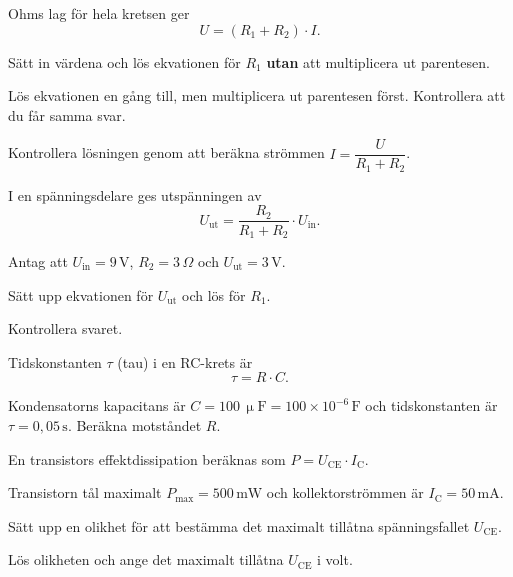 Ohms lag för hela kretsen ger
\[
  U = (R_1 + R_2) \cdot I.
\]
\begin{parts}
  \item Sätt in värdena och lös ekvationen för $R_1$ \textbf{utan} att multiplicera ut parentesen.
  \item Lös ekvationen en gång till, men multiplicera ut parentesen först. Kontrollera att du får
    samma svar.
  \item Kontrollera lösningen genom att beräkna strömmen $I = \dfrac{U}{R_1 + R_2}$.
\end{parts}

I en spänningsdelare ges utspänningen av
\[
  U_{\text{ut}} = \frac{R_2}{R_1 + R_2} \cdot U_{\text{in}}.
\]


Antag att $U_{\text{in}} = 9\,\text{V}$, $R_2 = 3\,\Omega$ och $U_{\text{ut}} = 3\,\text{V}$.
\begin{parts}
  \item Sätt upp ekvationen för $U_{\text{ut}}$ och lös för $R_1$.
  \item Kontrollera svaret.
\end{parts}

Tidskonstanten $\tau$ (tau) i en RC-krets är
\[
  \tau = R \cdot C.
\]


Kondensatorns kapacitans är $C = 100\,\upmu\text{F} = 100 \times 10^{-6}\,\text{F}$ och
tidskonstanten är $\tau = 0{,}05\,\text{s}$. Beräkna motståndet $R$.

En transistors effektdissipation beräknas som $P = U_{\text{CE}} \cdot I_{\text{C}}$.


Transistorn tål maximalt $P_{\max} = 500\,\text{mW}$ och kollektorströmmen är
$I_{\text{C}} = 50\,\text{mA}$.
\begin{parts}
  \item Sätt upp en olikhet för att bestämma det maximalt tillåtna spänningsfallet
    $U_{\text{CE}}$.
  \item Lös olikheten och ange det maximalt tillåtna $U_{\text{CE}}$ i volt.
\end{parts}

